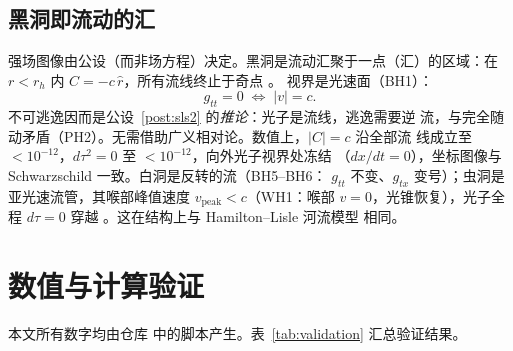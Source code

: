 \documentclass[aps,prd,preprint,superscriptaddress,amsmath,amssymb]{revtex4-2}
\begin{document}
\subsection{黑洞即流动的汇}

强场图像由公设（而非场方程）决定。黑洞是流动汇聚于一点（汇）的区域：在
$r<r_h$ 内 $C=-c\,\hat{r}$，所有流线终止于奇点 \cite{ProjectionPhysics-MF}。
视界是光速面（BH1）：
\begin{equation}
g_{tt}=0 \;\Longleftrightarrow\; |v|=c .
\end{equation}
不可逃逸因而是公设~\ref{post:sls2} 的\emph{推论}：光子是流线，逃逸需要逆
流，与完全随动矛盾（PH2）。无需借助广义相对论。数值上，$|C|=c$ 沿全部流
线成立至 $<10^{-12}$，$d\tau^2=0$ 至 $<10^{-12}$，向外光子视界处冻结
（$dx/dt=0$），坐标图像与 Schwarzschild 一致。白洞是反转的流（BH5--BH6：
$g_{tt}$ 不变、$g_{tx}$ 变号）；虫洞是亚光速流管，其喉部峰值速度
$v_{\mathrm{peak}}<c$（WH1：喉部 $v=0$，光锥恢复），光子全程 $d\tau=0$
穿越 \cite{ProjectionPhysics-BH}。这在结构上与 Hamilton--Lisle 河流模型
\cite{HamiltonLisle2008} 相同。

\section{数值与计算验证}\label{sec:validation}

本文所有数字均由仓库 \cite{ProjectionPhysics} 中的脚本产生。表~\ref{tab:validation}
汇总验证结果。
\end{document}
